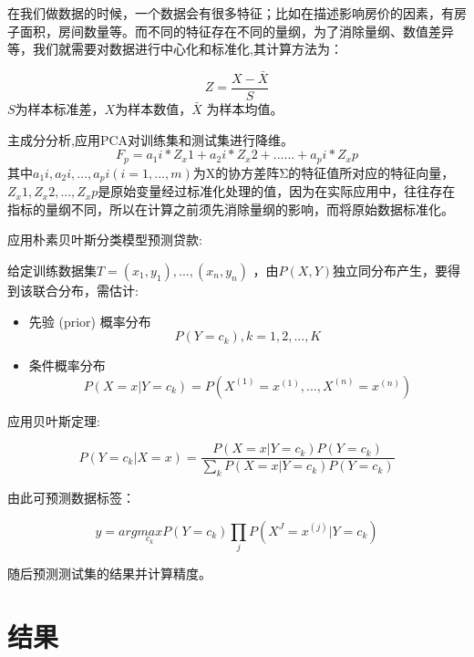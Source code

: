 \documentclass[UTF8]{ctexart}
\begin{document}
在我们做数据的时候，一个数据会有很多特征；比如在描述影响房价的因素，有房子面积，房间数量等。而不同的特征存在不同的量纲，为了消除量纲、数值差异等，我们就需要对数据进行中心化和标准化,其计算方法为：

\begin{equation}
	Z = \frac{X-\bar{X}}{S}
\end{equation}
$S$为样本标准差，$X$为样本数值，$\bar{X}$ 为样本均值。

主成分分析,应用PCA对训练集和测试集进行降维。
\begin{equation}
	F_p = a_1i*Z_x1+a_2i*Z_x2+......+a_pi*Z_xp
\end{equation}
其中$a_1i, a_2i, ...,a_pi(i=1,...,m)$为X的协方差阵Σ的特征值所对应的特征向量，$Z_x1, Z_x2, ..., Z_xp$是原始变量经过标准化处理的值，因为在实际应用中，往往存在指标的量纲不同，所以在计算之前须先消除量纲的影响，而将原始数据标准化。



应用朴素贝叶斯分类模型预测贷款:

给定训练数据集$T = {(x_1,y_1),...,(x_n,y_n)}$ ，由$P(X,Y)$独立同分布产生，要得到该联合分布，需估计:

\begin{itemize}
	\item 先验 (prior) 概率分布
	\begin{equation}
		P(Y=c_k),k =1,2,...,K
	\end{equation}
	\item 条件概率分布
	\begin{equation}
		P(X=x|Y=c_k) = P(X^{(1)} = x^{(1)},...,X^{(n)} = x^{(n)})
	\end{equation}
	
\end{itemize}

应用贝叶斯定理:

\begin{equation}
	P(Y=c_k|X=x) = \frac{P(X=x|Y=c_k)P(Y=c_k)}{\sum_{k}P(X=x|Y=c_k)P(Y=c_k)}
\end{equation}

由此可预测数据标签：

\begin{equation}
	y = arg  \underset{c_k}{max} P(Y=c_k)\prod_{j}P(X^{J}=x^{(j)}|Y=c_k)
\end{equation}

随后预测测试集的结果并计算精度。
\section{结果}
\end{document}

